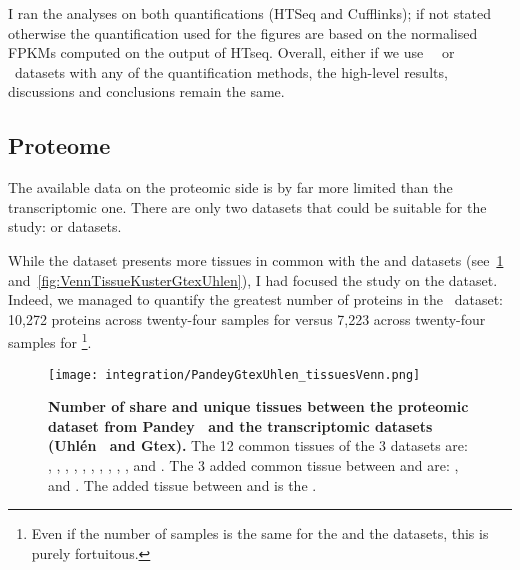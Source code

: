 I ran the analyses on both quantifications (HTSeq and Cufflinks); if not stated
otherwise the quantification used for the figures are based on the normalised
\glspl{FPKM} computed on the output of HTseq.
Overall, either if we use \uhlen\ \etal\ or
\gtex\ datasets with any of the quantification methods, the high-level
results, discussions and conclusions remain the same.

\subsection{Proteome}
The available data on the proteomic side is by far more limited than the
transcriptomic one. There are only two datasets that could be suitable for
the study:  or  datasets.

While the  dataset presents more tissues in common
with the  and  datasets
(see~\cref{fig:VennTissuePandeyGtexUhlen}
and~\cref{fig:VennTissueKusterGtexUhlen}), I had focused the study on
the  dataset.
Indeed, we managed to quantify the greatest number of proteins
in the \pandey\ dataset: 10,272 proteins across twenty-four samples for
 versus 7,223 across twenty-four samples for \footnote{Even
if the number of samples is the same for the  and
the  datasets, this is purely fortuitous.}.

\begin{figure}[!htbp]
    \texttt{[image: integration/PandeyGtexUhlen\_tissuesVenn.png]}
    \centering
    \caption[Number of share and unique tissues between the proteomic
    dataset from Pandey \etal\ and the transcriptomic datasets (Uhlén \etal\ and
    Gtex)]{\label{fig:VennTissuePandeyGtexUhlen}\textbf{Number of share and unique
    tissues between the proteomic dataset from Pandey \etal\ and the
    transcriptomic datasets (Uhlén \etal\ and Gtex).} The 12 common tissues of
    the 3 datasets are:
    , , , ,
    , , , , ,
    ,  and . The 3 added common
    tissue between  and  are:
    ,  and . The added tissue
    between  and  is the .}
\end{figure}

